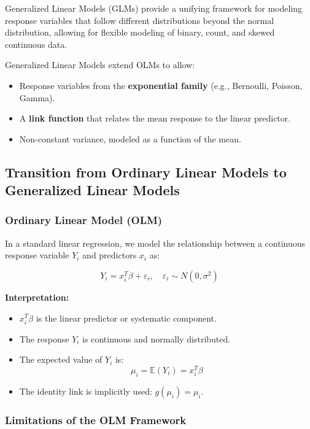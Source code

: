 \documentclass[12pt,a4paper]{article}
\begin{document}
Generalized Linear Models (GLMs) provide a unifying framework for modeling response variables that follow different distributions beyond the normal distribution, allowing for flexible modeling of binary, count, and skewed continuous data.





Generalized Linear Models extend OLMs to allow:
\begin{itemize}
  \item Response variables from the \textbf{exponential family} (e.g., Bernoulli, Poisson, Gamma).
  \item A \textbf{link function} that relates the mean response to the linear predictor.
  \item Non-constant variance, modeled as a function of the mean.
\end{itemize}



\subsection{Transition from Ordinary Linear Models to Generalized Linear Models}

\subsubsection*{Ordinary Linear Model (OLM)}

In a standard linear regression, we model the relationship between a continuous response variable \( Y_i \) and predictors \( x_i \) as:

\[
Y_i = x_i^T \beta + \varepsilon_i, \quad \varepsilon_i \sim N(0, \sigma^2)
\]

\textbf{Interpretation:}
\begin{itemize}
  \item \( x_i^T \beta \) is the linear predictor or systematic component.
  \item The response \( Y_i \) is continuous and normally distributed.
  \item The expected value of \( Y_i \) is:
  \[
  \mu_i = \mathbb{E}(Y_i) = x_i^T \beta
  \]
  \item The identity link is implicitly used: \( g(\mu_i) = \mu_i \).
\end{itemize}

\subsubsection*{Limitations of the OLM Framework}
\end{document}
